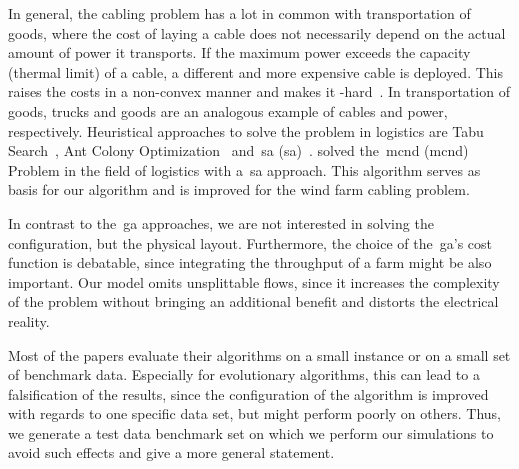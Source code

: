 In general, the cabling problem has a lot in common with transportation of
goods, where the cost of laying a cable does not necessarily depend on the
actual amount of power it transports. If the maximum power exceeds the capacity
(thermal limit) of a cable, a different and more expensive cable is deployed.
This raises the costs in a non-convex manner and makes it
\NP-hard~\parencite{20084889}. In transportation of goods, trucks and goods are
an analogous example of cables and power, respectively. Heuristical approaches
to solve the problem in logistics are Tabu Search~\parencite{Glover1999}, Ant
Colony Optimization~\parencite{Dorigo2001} and~\acrlong{sa}
(\gls{sa})~\parencite{Osman1996}. \citeauthor{20084889} solved
the~\acrlong{mcnd} (\gls{mcnd}) Problem in the field of logistics with
a~\gls{sa} approach. This algorithm serves as basis for our algorithm and
is improved for the wind farm cabling problem.

In contrast to the~\gls{ga} approaches, we are not interested in solving
the configuration, but the physical layout. Furthermore, the choice of
the~\gls{ga}'s cost function is debatable, since integrating the throughput
of a farm might be also important. Our model omits unsplittable flows, since it
increases the complexity of the problem without bringing an additional benefit
and distorts the electrical reality.

Most of the papers evaluate their algorithms on a small instance or on a small
set of benchmark data. Especially for evolutionary algorithms, this can lead to
a falsification of the results, since the configuration of the algorithm is
improved with regards to one specific data set, but might perform poorly on
others. Thus, we generate a test data benchmark set on which we perform our
simulations to avoid such effects and give a more general statement.